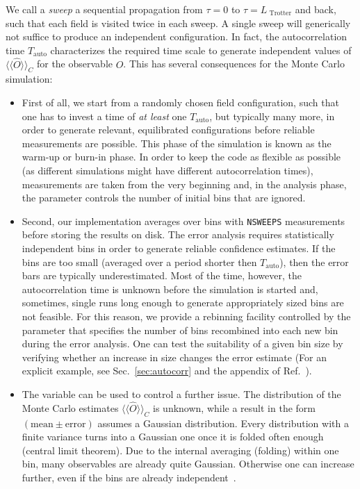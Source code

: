 We call a \textit{sweep} a sequential propagation from $\tau = 0$ to $\tau = L_{\text{ Trotter}}$ and back, such that each field is visited twice in each sweep. A single sweep will generically not suffice to produce an independent configuration.
In fact, the autocorrelation time $T_\mathrm{auto}$ characterizes the required time scale to generate independent values of $\langle\langle\hat{O}\rangle\rangle_C$ for the observable $O$. This has several consequences for the Monte Carlo simulation:
\begin{itemize}
	\item First of all, we start from a randomly chosen field configuration, such that one has to invest a time of \emph{at least} one $T_\mathrm{auto}$, but typically many more, in order to generate relevant, equilibrated configurations before reliable measurements are possible. This phase of the simulation is known as the warm-up or burn-in phase. In order to keep the code as flexible as possible (as different simulations might have different autocorrelation times), measurements are taken from the very beginning and, in the analysis phase, the parameter  controls the number of initial bins that are ignored.
	\item Second, our implementation averages over bins with \texttt{NSWEEPS} measurements before storing the results on disk. The  error analysis requires statistically  independent bins in order to generate reliable confidence estimates. If the bins are too small (averaged over a period shorter then $T_\mathrm{auto}$), then the error bars are typically underestimated. Most of the time, however, the autocorrelation time is unknown before the simulation is started and, sometimes, single runs long enough to generate appropriately sized bins are not feasible. For this reason, we provide a rebinning facility controlled by the parameter  that specifies the number of bins recombined into each new bin during the error analysis. One can test the suitability of a given bin size by verifying whether an increase in size changes the error estimate (For an explicit example, see Sec.~\ref{sec:autocorr} and the appendix of Ref.~\cite{Assaad02}).
	\item The  variable can be used to control a further issue. The distribution of the Monte Carlo estimates $\langle\langle\hat{O}\rangle\rangle_C$ is unknown, while a result in the form $(\mathrm{mean}\pm \mathrm{error})$ assumes a Gaussian distribution. Every distribution with a finite variance turns into a Gaussian one once it is folded often enough (central limit theorem). Due to the internal averaging (folding) within one bin, many observables are already quite Gaussian. Otherwise one can increase  further, even if the bins are already independent~\cite{Bercx17}.

\end{itemize}
